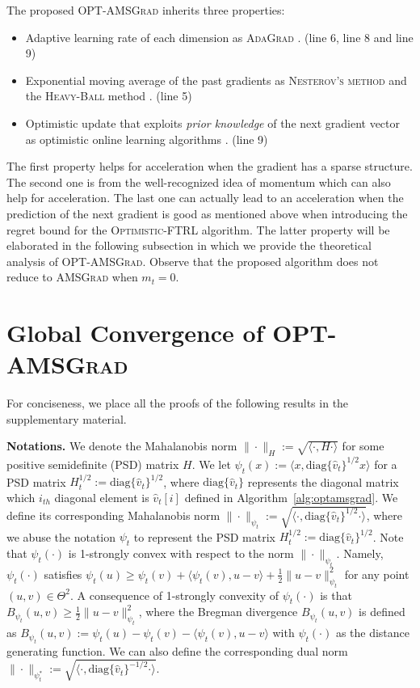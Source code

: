 \documentclass[11pt]{article}
\theoremstyle{k}
\begin{document}
The proposed \textsc{OPT-AMSGrad} inherits three properties:
\begin{itemize}
\item Adaptive learning rate of each dimension as \textsc{AdaGrad} \citep{DHS11}. (line 6, line 8 and line 9)
\item Exponential moving average of the past gradients as \textsc{Nesterov's method} \citep{N04} and the \textsc{Heavy-Ball} method \citep{P64}. (line 5)
\item Optimistic update that exploits \emph{prior knowledge} of the next gradient vector as optimistic online learning algorithms \citep{CJ12,rakhlin2013online,SALS15}. (line 9)
\end{itemize}
The first property helps for acceleration when the gradient has a sparse structure.
The second one is from the well-recognized idea of momentum which can also help for acceleration. 
The last one can actually lead to an acceleration when the prediction of the next gradient is good as mentioned above when introducing the regret bound for the \textsc{Optimistic-FTRL} algorithm.
The latter property will be elaborated in the following subsection in which we provide the theoretical analysis of \textsc{OPT-AMSGrad}.
Observe that the proposed algorithm does not reduce to \textsc{AMSGrad} when $m_{t}=0$.

\vspace{-0.1in}
\section{Global Convergence of \textsc{OPT-AMSGrad}}\label{sec:analysis}
For conciseness, we place all the proofs of the following results in the supplementary material.

\textbf{Notations.}\hspace{0.1in}
We denote the Mahalanobis norm $\|\cdot\|_H := \sqrt{ \langle \cdot, H \cdot \rangle }$ for some positive semidefinite (PSD) matrix $H$.
We let $\psi_t(x) := \langle x, \text{diag}\{\hat{v}_t\}^{1/2} x \rangle$ for a PSD matrix $H_t^{1/2}:= \text{diag}\{\hat{v}_t\}^{1/2}$, where $\text{diag}\{\hat{v}_t\}$ represents the diagonal matrix which $i_{th}$ diagonal element is $\hat{v}_t[i]$ defined in Algorithm~\ref{alg:optamsgrad}.
We define its corresponding Mahalanobis norm $\| \cdot \|_{\psi_t}:=  \sqrt{ \langle \cdot, \text{diag}\{\hat{v}_t\}^{1/2} \cdot \rangle }$,
where we abuse the notation $\psi_t$ to represent the PSD matrix $H_t^{1/2}:=\text{diag}\{\hat{v}_t\}^{1/2}$.
Note that $\psi_t(\cdot)$ is 1-strongly convex with respect to the norm $\| \cdot \|_{\psi_t}$.
Namely, $\psi_t(\cdot)$ satisfies $\psi_t(u) \geq \psi_t(v) + \langle \psi_t(v), u - v \rangle + \frac{1}{2} \| u - v\|^2_{\psi_t}$ for any point $(u,v) \in \Theta^2$.
A consequence of 1-strongly convexity of $\psi_t(\cdot)$ is that $B_{\psi_t}(u,v) \geq \frac{1}{2} \| u - v \|^2_{\psi_t}$, where the Bregman divergence $B_{\psi_t}(u,v)$ is defined as $B_{\psi_t}(u,v) := \psi_t(u) - \psi_t(v) - \langle \psi_t(v), u - v \rangle$ with $\psi_t(\cdot)$ as the distance generating function.
We can also define the corresponding dual norm $\| \cdot \|_{\psi_t^*}:= \sqrt{ \langle \cdot, \text{diag}\{\hat{v}_t\}^{-1/2} \cdot \rangle }$.
\end{document}
